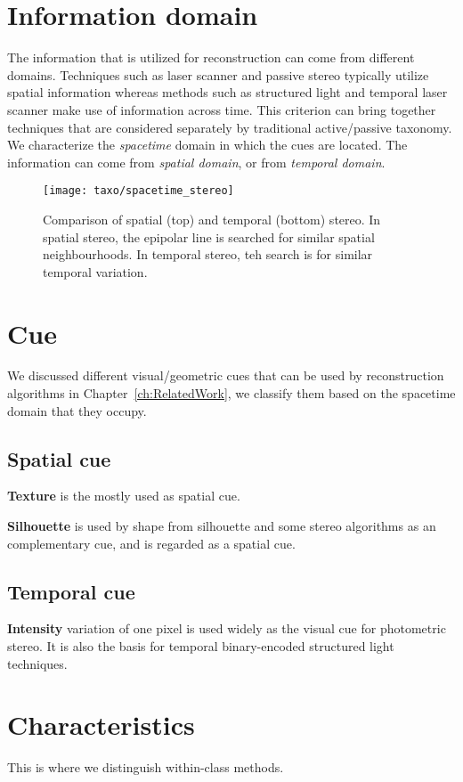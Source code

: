 \section{Information domain}
The information that is utilized for reconstruction can come from different domains. Techniques such as laser scanner and passive stereo typically utilize spatial information whereas methods such as structured light and temporal laser scanner make use of information across time. This criterion can bring together techniques that are considered separately by traditional active/passive taxonomy. We characterize the \textit{spacetime} domain in which the cues are located. The information can come from \textit{spatial domain}, or from \textit{temporal domain}. 
\begin{figure}[h]
\centering
\texttt{[image: taxo/spacetime\_stereo]}
\caption{Comparison of spatial (top) and temporal (bottom) stereo. In spatial stereo, the epipolar line is searched for similar spatial neighbourhoods. In temporal stereo, teh search is for similar temporal variation.}
\label{fig:spacetime_stereo}
\end{figure}

\section{Cue}
We discussed different visual/geometric cues that can be used by reconstruction algorithms in Chapter~\ref{ch:RelatedWork}, we classify them based on the spacetime domain that they occupy.
\subsection{Spatial cue}
\textbf{Texture} is the mostly used as spatial cue.

\textbf{Silhouette} is used by shape from silhouette and some stereo algorithms as an complementary cue, and is regarded as a spatial cue.

\subsection{Temporal cue}
\textbf{Intensity} variation of one pixel is used widely as the visual cue for photometric stereo. It is also the basis for temporal binary-encoded structured light techniques.

\section{Characteristics}
This is where we distinguish within-class methods.

